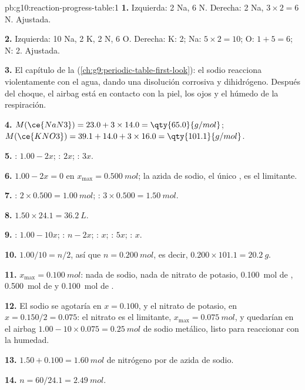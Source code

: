 \begin{solution}{pb:g10:reaction-progress-table:1}
\textbf{1.} Izquierda: 2 Na, 6 N. Derecha: 2 Na, $3 \times 2 = 6$ N.
Ajustada.

\textbf{2.} Izquierda: 10 Na, 2 K, 2 N, 6 O. Derecha: K: 2; Na:
$5 \times 2 =
10$; O: $1 + 5 = 6$; N: 2. Ajustada.

\textbf{3.} El capítulo de la 
(\cref{ch:g9:periodic-table-first-look}): el sodio reacciona
violentamente con el agua, dando una disolución corrosiva y
dihidrógeno. Después del choque, el airbag está en contacto con la piel,
los ojos y el  húmedo de la respiración.

\textbf{4.} $M(\ce{NaN3}) = 23.0 + 3 \times 14.0 = \qty{65.0}{g/mol}$;
$M(\ce{KNO3}) = 39.1 + 14.0 + 3 \times 16.0 = \qty{101.1}{g/mol}$.

\textbf{5.} : $1.00 - 2x$; : $2x$; : $3x$.

\textbf{6.} $1.00 - 2x = 0$ en $x_{\max} = \qty{0.500}{mol}$; la azida
de sodio, el único , es el limitante.

\textbf{7.} : $2 \times 0.500 = \qty{1.00}{mol}$; :
$3 \times 0.500 = \qty{1.50}{mol}$.

\textbf{8.} $1.50 \times 24.1 = \qty{36.2}{L}$.

\textbf{9.} : $1.00 - 10x$; : $n - 2x$; : $x$;
: $5x$; : $x$.

\textbf{10.} $1.00/10 = n/2$, así que $n = \qty{0.200}{mol}$, es decir,
$0.200 \times 101.1 = \qty{20.2}{g}$.

\textbf{11.} $x_{\max} = \qty{0.100}{mol}$: nada de sodio, nada de
nitrato de potasio, \qty{0.100}{mol} de , \qty{0.500}{mol} de
 y \qty{0.100}{mol} de .

\textbf{12.} El sodio se agotaría en $x = 0.100$, y el nitrato de
potasio, en $x = 0.150/2 = 0.075$: el nitrato es el limitante,
$x_{\max} =
\qty{0.075}{mol}$, y quedarían en el airbag
$1.00 - 10 \times 0.075 = \qty{0.25}{mol}$ de sodio metálico, listo para
reaccionar con la humedad.

\textbf{13.} $1.50 + 0.100 = \qty{1.60}{mol}$ de nitrógeno por  de
azida de sodio.

\textbf{14.} $n = 60 / 24.1 = \qty{2.49}{mol}$.


\end{solution}
